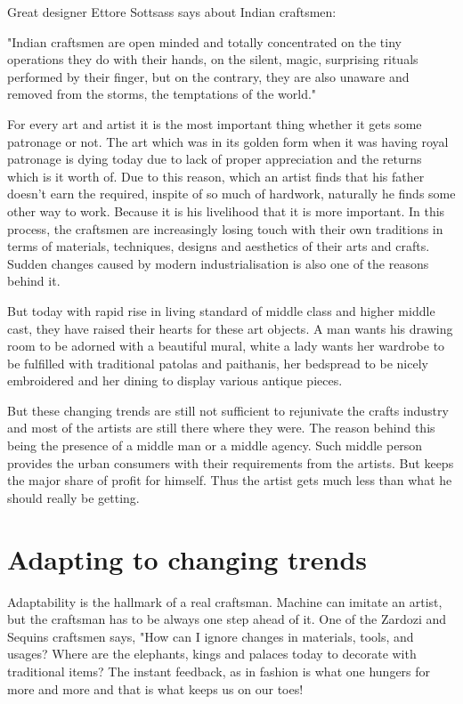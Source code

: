 Great designer Ettore Sottsass says about Indian craftsmen:

"Indian craftsmen are open minded and totally concentrated on the tiny operations they do with their hands, on the silent, magic, surprising rituals performed by their finger, but on the contrary, they are also unaware and removed from the storms, the temptations of the world."

For every art and artist it is the most important thing whether it gets some patronage or not. The art which was in its golden form when it was having royal patronage is dying today due to lack of proper appreciation and the returns which is it worth of. Due to this reason, which an artist finds that his father doesn't earn the required, inspite of so much of hardwork, naturally he finds some other way to work. Because it is his livelihood that it is more important. In this process, the craftsmen are increasingly losing touch with their own traditions in terms of materials, techniques, designs and aesthetics of their arts and crafts. Sudden changes caused by modern industrialisation is also one of the reasons behind it.

But today with rapid rise in living standard of middle class and higher middle cast, they have raised their hearts for these art objects. A man wants his drawing room to be adorned with a beautiful mural, white a lady wants her wardrobe to be fulfilled with traditional patolas and paithanis, her bedspread to be nicely embroidered and her dining to display various antique pieces.

But these changing trends are still not sufficient to rejunivate the crafts industry and most of the artists are still there where they were. The reason behind this being the presence of a middle man or a middle agency. Such middle person provides the urban consumers with their requirements from the artists. But keeps the major share of profit for himself. Thus the artist gets much less than what he should really be getting.


\section{Adapting to changing trends} %
\label{sec:act}

Adaptability is the hallmark of a real craftsman. Machine can imitate an artist, but the craftsman has to be always one step ahead of it. One of the Zardozi and Sequins craftsmen says, "How can I ignore changes in materials, tools, and usages? Where are the elephants, kings and palaces today to decorate with traditional items? The instant feedback, as in fashion is what one hungers for more and more and that is what keeps us on our toes!

